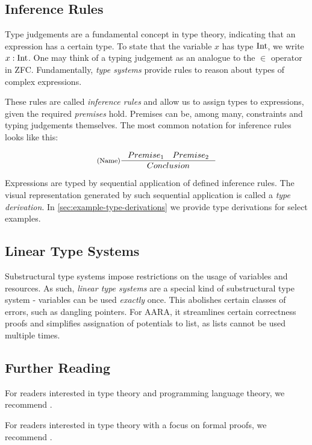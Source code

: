\subsection{Inference Rules}

Type judgements are a fundamental concept in type theory, indicating that an expression has a certain type. To state that the variable \(x\) has type \(\text{Int}\), we write \(x : \text{Int}\). One may think of a typing judgement as an analogue to the \(\in\) operator in ZFC. Fundamentally, \emph{type systems} provide rules to reason about types of complex expressions.

These rules are called \emph{inference rules} and allow us to assign types to expressions, given the required \emph{premises} hold. Premises can be, among many, constraints and typing judgements themselves. The most common notation for inference rules looks like this: 

\[
   \inference[(Name)]
   {Premise_1 \quad Premise_2}
   {Conclusion}
\]

Expressions are typed by sequential application of defined inference rules. The visual representation generated by such sequential application is called a \emph{type derivation}. In \cref{sec:example-type-derivations} we provide type derivations for select examples.

\subsection{Linear Type Systems}

Substructural type systems impose restrictions on the usage of variables and resources. As such, \emph{linear type systems} are a special kind of substructural type system - variables can be used \emph{exactly} once. This abolishes certain classes of errors, such as dangling pointers. For AARA, it streamlines certain correctness proofs and simplifies assignation of potentials to list, as lists cannot be used multiple times.

\subsection{Further Reading}

For readers interested in type theory and programming language theory, we recommend \cite{pierceTypesProgrammingLanguages2002}.

For readers interested in type theory with a focus on formal proofs, we recommend \cite{nederpeltTypeTheoryFormal2014}.

